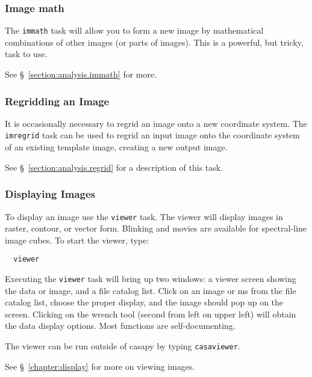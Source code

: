 \subsubsection{Image math}
\label{section:intro.walkthru.analysis.immath}

The {\tt immath} task will allow you to form a new image by
mathematical combinations of other images (or parts of images).
This is a powerful, but tricky, task to use.

See \S~\ref{section:analysis.immath} for more.

\subsubsection{Regridding an Image}
\label{section:intro.walkthru.analysis.regrid}

It is occasionally necessary to regrid an image onto a new
coordinate system.  The {\tt imregrid} task can be used
to regrid an input image onto the coordinate system of an
existing template image, creating a new output image.

See \S~\ref{section:analysis.regrid} for a description of
this task.

\subsubsection{Displaying Images}
\label{section:intro.walkthru.analysis.display}

To display an image use the {\tt viewer} task.  The viewer will
display images in raster, contour, or vector form.  Blinking and
movies are available for spectral-line image cubes.  To start the
viewer, type:

\small
\begin{verbatim}
  viewer
\end{verbatim}
\normalsize

Executing the {\tt viewer} task will bring up two windows: a viewer
screen showing the data or image, and a file catalog list. Click on an
image or ms from the file catalog list, choose the proper display, and
the image should pop up on the screen. Clicking on the wrench
tool (second from left on upper left) will obtain the data display
options. Most functions are self-documenting. 

The viewer can be run outside of casapy by typing {\tt casaviewer}. 

See \S~\ref{chapter:display} for more on viewing images.

